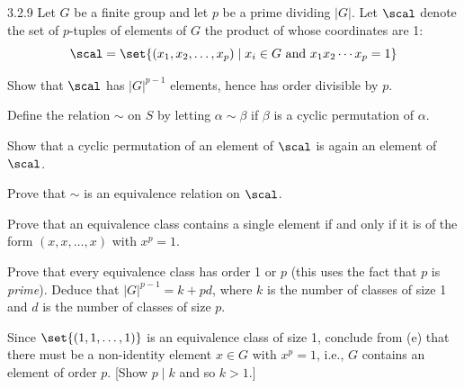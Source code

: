 \begin{spex}{3.2.9}
    Let $G$ be a finite group and let $p$ be a prime dividing $|G|$.
	Let $\scal$ denote the set of $p$-tuples of elements of $G$ the product of whose coordinates are 1:
    \[
    	\scal = \set{(x_1, x_2, \ldots, x_p) \mid x_i \in G \text{ and } x_1x_2 \cdots x_p = 1}
    \]
    \begin{subexercises}
        \item Show that $\scal$ has $|G|^{p-1}$ elements, hence has order divisible by $p$.
    \end{subexercises}
    Define the relation $\sim$ on $S$ by letting $\alpha \sim \beta$ if $\beta$ is a cyclic permutation of $\alpha$.
    \begin{subexercises}[resume]
        \item Show that a cyclic permutation of an element of $\scal$ is again an element of $\scal$.
        \item Prove that $\sim$ is an equivalence relation on $\scal$.
        \item Prove that an equivalence class contains a single element if and only if it is of the form $(x, x, \dots, x)$ with $x^p = 1$.
        \item Prove that every equivalence class has order 1 or $p$ (this uses the fact that $p$ is \emph{prime}).
		Deduce that $|G|^{p-1} = k + pd$, where $k$ is the number of classes of size 1 and $d$ is the number of classes of size $p$.
        \item Since $\set{(1, 1, \dots, 1)}$ is an equivalence class of size 1, conclude from (e) that there must be a non-identity element $x \in G$ with $x^p = 1$, i.e., $G$ contains an element of order $p$. [Show $p \mid k$ and so $k > 1$.]
    \end{subexercises}
\end{spex}

